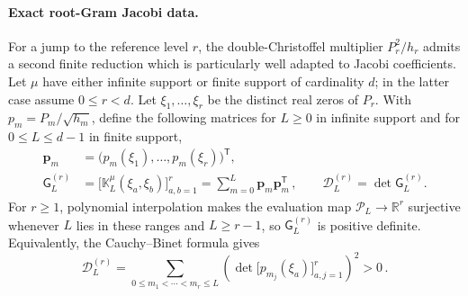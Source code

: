 \documentclass[a4paper,11pt]{article}
\theoremstyle{definition}
\theoremstyle{remark}
\newcommand{\RR}{\mathbb R}
\newcommand{\cP}{\mathcal P}
\begin{document}
\paragraph{Exact root-Gram Jacobi data.}
For a jump to the reference level $r$, the double-Christoffel multiplier
$P_r^2/h_r$ admits a second finite reduction which is particularly well
adapted to Jacobi coefficients.  Let $\mu$ have either infinite support
or finite support of cardinality $d$; in the latter case assume
$0\le r<d$.  Let $\xi_1,\ldots,\xi_r$ be the distinct real zeros of
$P_r$.  With $p_m=P_m/\sqrt{h_m}$, define the following matrices for
$L\ge0$ in infinite support and for $0\le L\le d-1$ in finite support, 
\begin{equation}
\begin{aligned}
   \boldsymbol p_m
   &=\bigl(p_m(\xi_1),\ldots,p_m(\xi_r)\bigr)^{\mathsf T},\\
   \mathsf G_L^{(r)}
   &=\bigl[\mathbb K_L^\mu(\xi_a,\xi_b)\bigr]_{a,b=1}^{r}
   =\sum_{m=0}^{L}\boldsymbol p_m\boldsymbol p_m^{\mathsf T}\,,
   \qquad
   \mathcal D_L^{(r)}=\det\mathsf G_L^{(r)}.
\end{aligned}
   \label{eq:root-Gram-definition-app}
\end{equation}
For $r\ge1$, polynomial interpolation makes the evaluation map
$\cP_L\to\RR^r$ surjective whenever $L$ lies in these ranges and
$L\ge r-1$, so $\mathsf G_L^{(r)}$ is positive definite.
Equivalently, the Cauchy--Binet formula \cite{HornJohnson2013} gives
\begin{equation}
   \mathcal D_L^{(r)}
   =\sum_{0\le m_1<\cdots<m_r\le L}
      \left(
      \det\!\bigl[p_{m_j}(\xi_a)\bigr]_{a,j=1}^{r}
      \right)^2>0\,.
   \label{eq:root-Gram-Cauchy-Binet-app}
\end{equation}
\end{document}
